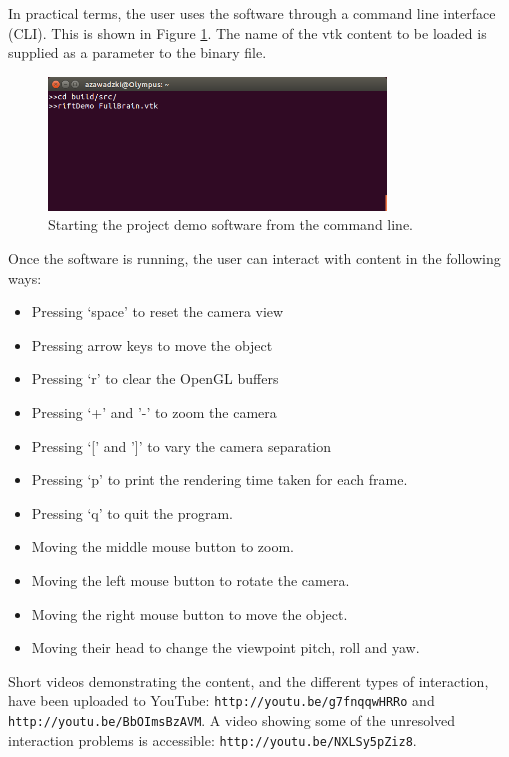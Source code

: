 \documentclass[MSc,paper=a4,pagesize=auto]{icldt}
\begin{document}
In practical terms, the user uses the software through a command line interface (CLI). This is shown in Figure \ref{fig:command_line_interface}. The name of the vtk content to be loaded is supplied as a parameter to the binary file.

\begin{figure}[htbp!]
    \centering
    \includegraphics[width=0.8\textwidth]{resources/command_line_interface}
    \caption{Starting the project demo software from the command line.}
    \label{fig:command_line_interface}
\end{figure}

Once the software is running, the user can interact with content in the following ways:
\begin{itemize}
\item Pressing `space' to reset the camera view
\item Pressing arrow keys to move the object
\item Pressing `r' to clear the OpenGL buffers
\item Pressing `+' and '-' to zoom the camera
\item Pressing `[' and ']' to vary the camera separation
\item Pressing `p' to print the rendering time taken for each frame.
\item Pressing `q' to quit the program.
\item Moving the middle mouse button to zoom.
\item Moving the left mouse button to rotate the camera.
\item Moving the right mouse button to move the object.
\item Moving their head to change the viewpoint pitch, roll and yaw.
\end{itemize}

Short videos demonstrating the content, and the different types of interaction, have been uploaded to YouTube: \texttt{http://youtu.be/g7fnqqwHRRo} and \texttt{http://youtu.be/BbOImsBzAVM}. A video showing some of the unresolved interaction problems is accessible: \texttt{http://youtu.be/NXLSy5pZiz8}.
\end{document}
